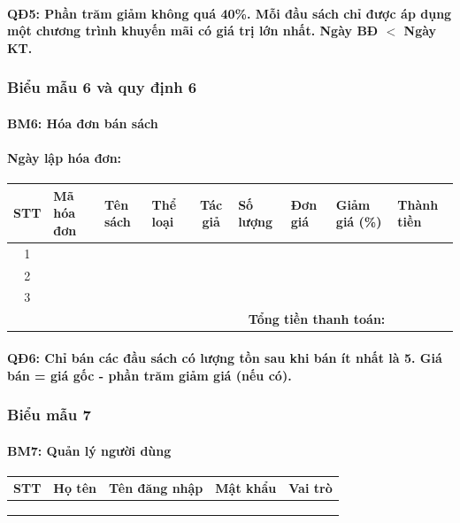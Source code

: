 \documentclass[12pt]{report}
\begin{document}
                \paragraph{QĐ5: Phần trăm giảm không quá 40\%. Mỗi đầu sách chỉ được áp dụng một chương trình khuyến mãi có giá trị lớn nhất. Ngày BĐ $<$ Ngày KT.}
            \subsubsection{Biểu mẫu 6 và quy định 6}
                \paragraph{BM6: Hóa đơn bán sách}
                \paragraph{Ngày lập hóa đơn:}
                \begin{tabularx}{\textwidth}{|c|>{\RaggedRight}X|>{\RaggedRight}X|>{\RaggedRight}X|c|>{\RaggedRight}X|>{\RaggedRight}X|>{\RaggedRight}X|>{\RaggedRight}X|}
                    \hline
                    \textbf{STT} & \textbf{Mã hóa đơn} & \textbf{Tên sách} & 
                    \textbf{Thể loại} & \textbf{Tác giả} & \textbf{Số lượng} & \textbf{Đơn giá} & \textbf{Giảm giá (\%)} & \textbf{Thành tiền} \\ \hline
                    1 & & & & & & & & \\ \hline
                    2 & & & & & & & & \\ \hline
                    3 & & & & & & & & \\ \hline
                    \multicolumn{8}{|r|}{\textbf{Tổng tiền thanh toán:}} & \\ \hline
                \end{tabularx}
                \paragraph{QĐ6: Chỉ bán các đầu sách có lượng tồn sau khi bán ít nhất là \textbf{5}. Giá bán = giá gốc - phần trăm giảm giá (nếu có).}
            \subsubsection{Biểu mẫu 7}
                \paragraph{BM7: Quản lý người dùng}
                \begin{tabular}{|c|l|l|l|c|}
                    \hline
                    \textbf{STT} & \textbf{Họ tên} & \textbf{Tên đăng nhập} & 
                    \textbf{Mật khẩu} & \textbf{Vai trò} \\ \hline
                     & & & & \\ \hline
                     & & & & \\ \hline
                     & & & & \\ \hline
                \end{tabular}
\end{document}
